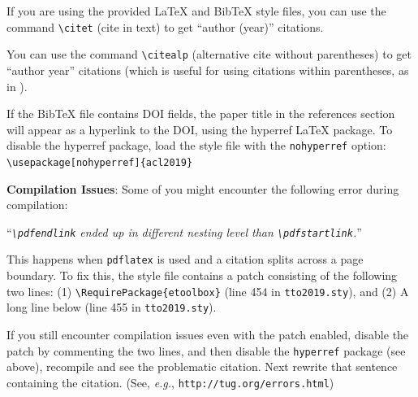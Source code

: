 \documentclass[11pt,a4paper]{article}
\begin{document}
If you are using the provided \LaTeX{} and Bib\TeX{} style files, you
can use the command \verb|\citet| (cite in text)
to get ``author (year)'' citations.

You can use the command \verb|\citealp| (alternative cite without 
parentheses) to get ``author year'' citations (which is useful for 
using citations within parentheses, as in \citealp{Gusfield:97}).

If the Bib\TeX{} file contains DOI fields, the paper
title in the references section will appear as a hyperlink
to the DOI, using the hyperref \LaTeX{} package.
To disable the hyperref package, load the style file
with the \verb|nohyperref| option: \\{\small
\verb|\usepackage[nohyperref]{acl2019}|}

\textbf{Compilation Issues}: Some of you might encounter the following error during compilation: 

``{\em \verb|\pdfendlink| ended up in different nesting level than \verb|\pdfstartlink|.}''

This happens when \verb|pdflatex| is used and a citation splits across a page boundary. To fix this, the style file contains a patch consisting of the following two lines: (1) \verb|\RequirePackage{etoolbox}| (line 454 in \texttt{tto2019.sty}), and (2) A long line below (line 455 in \texttt{tto2019.sty}).

If you still encounter compilation issues even with the patch enabled, disable the patch by commenting the two lines, and then disable the \verb|hyperref| package (see above), recompile and see the problematic citation.
Next rewrite that sentence containing the citation. (See, {\em e.g.}, {\small\tt http://tug.org/errors.html})


\end{document}
